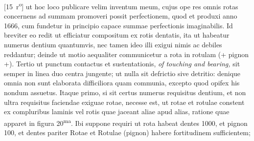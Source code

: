 \hspace{-1mm}[15~r\textsuperscript{o}] ut hoc loco publicare velim inventum meum, cujus ope res omnis rotas concernens ad summam promoveri possit perfectionem, quod et produxi anno 1666, cum fundetur in principio capace summae perfectionis imaginabilis. Id breviter eo redit ut efficiatur compositum ex rotis dentatis, ita ut habeatur numerus dentium quantumvis, nec tamen ideo illi exigui nimis ac debiles reddantur; deinde ut motio aequaliter communicetur a rota in rotulam (+ pignon +). Tertio ut punctum contactus et sustentationis, \textit{of touching and bearing,} sit semper in linea duo centra jungente;  ut nulla sit defrictio sive detritio: denique omnia non sunt elaborata difficiliora quam communia, excepto quod opifex his nondum assuetus. Itaque primo, si sit certus numerus requisitus dentium, 
et non ultra requisitus faciendae exiguae rotae, necesse est, ut rotae et rotulae constent ex compluribus laminis vel rotis quae jaceant aliae apud alias, ratione quae apparet in figura 20\textsuperscript{ma}. Ibi suppone requiri ut rota habeat dentes 1000, et pignon 100, 
et dentes pariter Rotae et Rotulae (pignon) habere fortitudinem sufficientem;
\pend
\newpage
\pstart \noindent 
